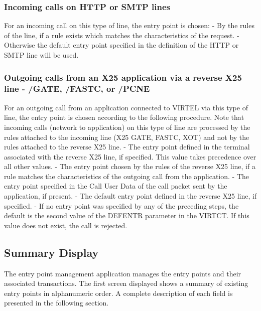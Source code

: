 \documentclass[letterpaper,10pt,english]{sphinxmanual}
\begin{document}
\subsubsection{Incoming calls on HTTP or SMTP lines}
\label{\detokenize{connectivity_guide:incoming-calls-on-http-or-smtp-lines}}
For an incoming call on this type of line, the entry point is chosen:
- By the rules of the line, if a rule exists which matches the characteristics of the request.
- Otherwise the default entry point specified in the definition of the HTTP or SMTP line will be used.


\subsubsection{Outgoing calls from an X25 application via a reverse X25 line - /GATE, /FASTC, or /PCNE}
\label{\detokenize{connectivity_guide:outgoing-calls-from-an-x25-application-via-a-reverse-x25-line-gate-fastc-or-pcne}}
For an outgoing call from an application connected to VIRTEL via this type of line, the entry point is chosen according
to the following procedure. Note that incoming calls (network to application) on this type of line are processed by the
rules attached to the incoming line (X25 GATE, FASTC, XOT) and not by the rules attached to the reverse X25 line.
- The entry point defined in the terminal associated with the reverse X25 line, if specified. This value takes precedence over all other values.
- The entry point chosen by the rules of the reverse X25 line, if a rule matches the characteristics of the outgoing call from the application.
- The entry point specified in the Call User Data of the call packet sent by the application, if present.
- The default entry point defined in the reverse X25 line, if specified.
- If no entry point was specified by any of the preceding steps, the default is the second value of the DEFENTR parameter in the VIRTCT. If this value does not exist, the call is rejected.


\subsection{Summary Display}
\label{\detokenize{connectivity_guide:id57}}\label{\detokenize{connectivity_guide:index-106}}
The entry point management application manages the entry points and their associated transactions. The first screen displayed shows a summary of existing entry points in alphanumeric order. A complete description of each field is presented in the following section.
\end{document}
